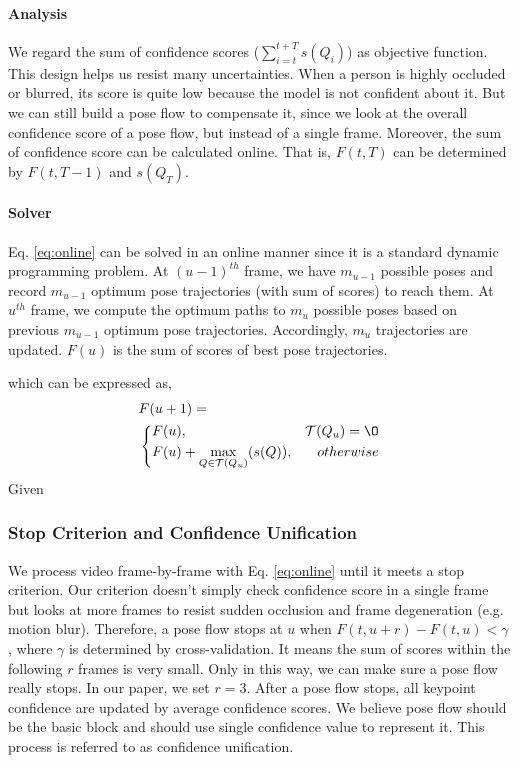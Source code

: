 \documentclass{bmvc2k}
\begin{document}
\paragraph{Analysis} We regard the sum of confidence scores ($\sum_{i=t}^{t+T} s(Q_i)$) as objective function. This design helps us resist many uncertainties. When a person is highly occluded or blurred, its score is quite low because the model is not confident about it. But we can still build a pose flow to compensate it, since we look at the overall confidence score of a pose flow, but instead of a single frame. Moreover, the sum of confidence score can be calculated online. That is, $F(t,T)$ can be determined by $F(t,T-1)$ and $s(Q_T)$.
\vspace{-4mm}
\paragraph{Solver} Eq. \ref{eq:online} can be solved in an online manner since it is a standard dynamic programming problem. At $(u-1)^{th}$ frame, we have $m_{u-1}$ possible poses and record $m_{u-1}$ optimum pose trajectories (with sum of scores) to reach them. At $u^{th}$ frame, we compute the optimum paths to $m_{u}$ possible poses based on previous $m_{u-1}$ optimum pose trajectories. Accordingly, $m_u$ trajectories are updated. $F(u)$ is the sum of scores of best pose trajectories. 

  which can be expressed as,
\begin{equation}
\begin{aligned}
&F(u+1) =\\
&\left\{
    \begin{aligned}
        &F(u) ,&\mathcal{T}(Q_{u}) = \O\\
        &F(u) + \max_{Q \in \mathcal{T}(Q_{u})}(s(Q)) ,&otherwise \\
\end{aligned}
\right.\\
\end{aligned}
\label{eq:online}
\end{equation}
Given  
\fi


\subsubsection{Stop Criterion and Confidence Unification} We process video frame-by-frame with Eq. \ref{eq:online} until it meets a stop criterion. Our criterion doesn't simply check confidence score in a single frame but looks at more frames to resist sudden occlusion and frame degeneration (e.g. motion blur). Therefore, a pose flow stops at $u$ when $F(t,u+r) - F(t,u) < \gamma$, where $\gamma$ is determined by cross-validation. It means the sum of scores within the following $r$ frames is very small. Only in this way, we can make sure a pose flow really stops. In our paper, we set $r = 3$. After a pose flow stops, all keypoint confidence are updated by average confidence scores. We believe pose flow should be the basic block and should use single confidence value to represent it. This process is referred to as confidence unification.
\vspace{-3mm}
\end{document}
